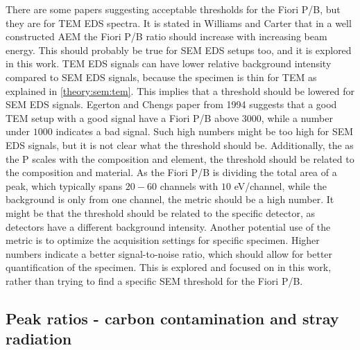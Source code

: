 There are some papers \cite{egerton_nio_characterization_1994,egerton_nio_characterization_1994,ted_pella_nio_tem_2019} suggesting acceptable thresholds for the Fiori P/B, but they are for TEM EDS spectra.
It is stated in Williams and Carter \cite[p. 614]{williams_carter_tem_2009} that in a well constructed AEM the Fiori P/B ratio should increase with increasing beam energy.
This should probably be true for SEM EDS setups too, and it is explored in this work.
TEM EDS signals can have lower relative background intensity compared to SEM EDS signals, because the specimen is thin for TEM as explained in \cref{theory:sem:tem}.
This implies that a threshold should be lowered for SEM EDS signals.
Egerton and Chengs paper from 1994 \cite{egerton_nio_characterization_1994} suggests that a good TEM setup with a good signal have a Fiori P/B above $3000$, while a number under $1000$ indicates a bad signal.
Such high numbers might be too high for SEM EDS signals, but it is not clear what the threshold should be.
Additionally, the as the P scales with the composition and element, the threshold should be related to the composition and material.
As the Fiori P/B is dividing the total area of a peak, which typically spans $20-60$ channels with $10$ eV/channel, while the background is only from one channel, the metric should be a high number.
It might be that the threshold should be related to the specific detector, as detectors have a different background intensity.
Another potential use of the metric is to optimize the acquisition settings for specific specimen.
Higher numbers indicate a better signal-to-noise ratio, which should allow for better quantification of the specimen.
This is explored and focused on in this work, rather than trying to find a specific SEM threshold for the Fiori P/B.






\subsection{Peak ratios - carbon contamination and stray radiation}
\label{theory:eds_performance:peakratio}

